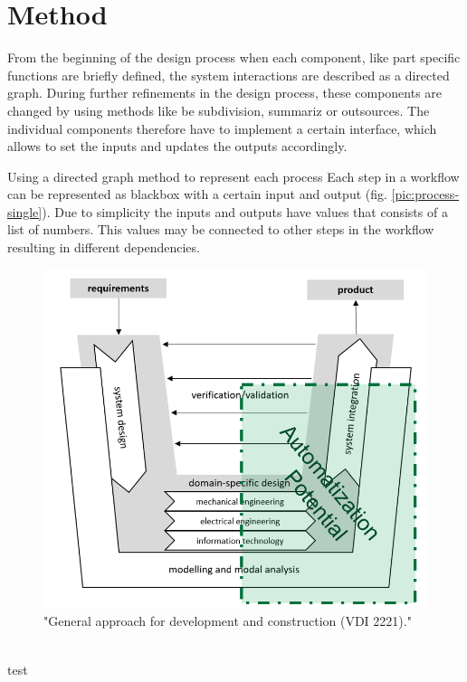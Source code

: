 \section{Method}
From the beginning of the design process when each component, 
like part specific functions are briefly defined, the system interactions 
are described as a directed graph.
During further refinements in the design process, 
these components are changed by using methods like be 
subdivision, summariz or outsources.
The individual components therefore have to implement a certain interface, 
which allows to set the inputs and updates the outputs accordingly.

Using a directed graph method to represent each process Each step in a workflow can be represented as blackbox with a certain input and output (fig. \ref{pic:process-single}).
Due to simplicity the inputs and outputs have values that consists of a list of numbers. 
This values may be connected to other steps in the workflow resulting in different dependencies.
\begin{figure}[h]
    \centering
    \includegraphics[scale=0.5]{pics/VDI_2206.PNG}
    \caption{\label{pic:VDI2206} "General approach for development and construction (VDI 2221)." \cite{Jansch2006THEDO}}
\end{figure}\\
test
